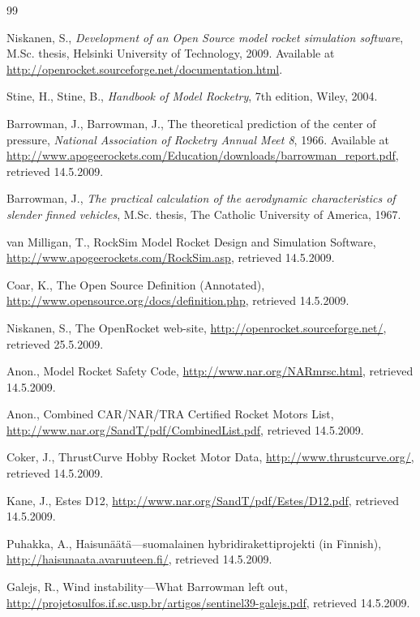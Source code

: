 \documentclass[a4paper,12pt,oneside]{book}
\begin{document}
\begin{thebibliography}{99}

 Niskanen, S., {\it Development of an Open Source
  model rocket simulation software}, M.Sc. thesis, Helsinki University
  of Technology, 2009.  Available at
  \url{http://openrocket.sourceforge.net/documentation.html}.

 Stine, H., Stine, B., {\it Handbook of Model
  Rocketry}, 7th edition, Wiley, 2004.

 Barrowman, J., Barrowman, J., The
  theoretical prediction of the center of pressure, {\it National
  Association of Rocketry Annual Meet 8}, 1966.  Available at
\url{http://www.apogeerockets.com/Education/downloads/barrowman_report.pdf},
  retrieved 14.5.2009.

 Barrowman, J., {\it The practical
  calculation of the aerodynamic characteristics of slender finned
  vehicles}, M.Sc. thesis, The Catholic University of America, 1967.

 van Milligan, T., RockSim Model Rocket Design and
  Simulation Software, \url{http://www.apogeerockets.com/RockSim.asp},
  retrieved 14.5.2009.

 Coar, K., The Open Source Definition
  (Annotated), \url{http://www.opensource.org/docs/definition.php},
  retrieved 14.5.2009.

 Niskanen, S., The OpenRocket web-site,
  \url{http://openrocket.sourceforge.net/}, retrieved 25.5.2009.

 Anon., Model Rocket Safety Code,
  \url{http://www.nar.org/NARmrsc.html}, retrieved 14.5.2009.

 Anon., Combined CAR/NAR/TRA Certified
  Rocket Motors List,
  \url{http://www.nar.org/SandT/pdf/CombinedList.pdf}, retrieved 14.5.2009.

 Coker, J., ThrustCurve Hobby Rocket
  Motor Data, \url{http://www.thrustcurve.org/}, retrieved 14.5.2009.

 Kane, J., Estes D12,
  \url{http://www.nar.org/SandT/pdf/Estes/D12.pdf}, retrieved 14.5.2009.

 Puhakka, A., Haisunäätä---suomalainen
  hybridirakettiprojekti (in Finnish),
  \url{http://haisunaata.avaruuteen.fi/}, retrieved 14.5.2009.

 Galejs, R., Wind instability---What Barrowman left
  out,
  \url{http://projetosulfos.if.sc.usp.br/artigos/sentinel39-galejs.pdf},
  retrieved 14.5.2009.


\end{thebibliography}
\end{document}
